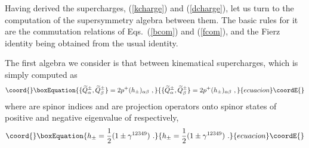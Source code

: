 \documentclass[a4paper,12pt]{article}
\begin{document}
Having derived the supercharges, (\ref{kcharge}) and (\ref{dcharge}),
let us turn to the computation of the supersymmetry algebra between
them.  The basic rules for it are the commutation relations of
Eqs.~(\ref{bcom}) and (\ref{fcom}), and the \coordHE{} Fierz identity
being obtained from the usual \coordHE{} identity.

The first algebra we consider is that between kinematical
supercharges, which is simply computed as
\begin{equation}\coord{}\boxEquation{
\{ \widetilde{Q}^\pm_\alpha, \widetilde{Q}^\pm_\beta \} 
= 2 p^+ (h_\pm)_{\alpha \beta} ~,
}{
\{ \widetilde{Q}^\pm_\alpha, \widetilde{Q}^\pm_\beta \} 
= 2 p^+ (h_\pm)_{\alpha \beta} ~,
}{ecuacion}\coordE{}\end{equation}
where \myHighlight{$\alpha, \beta$}\coordHE{} are spinor indices and \coordHE{} are projection
operators onto spinor states of positive and negative eigenvalue of 
\coordHE{} respectively,
\begin{equation}\coord{}\boxEquation{
h_\pm = \frac{1}{2} ( 1 \pm \gamma^{12349} ) ~.
}{
h_\pm = \frac{1}{2} ( 1 \pm \gamma^{12349} ) ~.
}{ecuacion}\coordE{}\end{equation}
\end{document}
